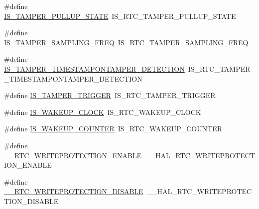 \begin{DoxyCompactItemize}
\item 
\#define \hyperlink{group___h_a_l___r_t_c___aliased___macros_gaf061929111a6987f8a74e09e239d686b}{I\+S\+\_\+\+T\+A\+M\+P\+E\+R\+\_\+\+P\+U\+L\+L\+U\+P\+\_\+\+S\+T\+A\+TE}~I\+S\+\_\+\+R\+T\+C\+\_\+\+T\+A\+M\+P\+E\+R\+\_\+\+P\+U\+L\+L\+U\+P\+\_\+\+S\+T\+A\+TE
\item 
\#define \hyperlink{group___h_a_l___r_t_c___aliased___macros_ga534eeb558f5ddd78594acc82dbc56b9d}{I\+S\+\_\+\+T\+A\+M\+P\+E\+R\+\_\+\+S\+A\+M\+P\+L\+I\+N\+G\+\_\+\+F\+R\+EQ}~I\+S\+\_\+\+R\+T\+C\+\_\+\+T\+A\+M\+P\+E\+R\+\_\+\+S\+A\+M\+P\+L\+I\+N\+G\+\_\+\+F\+R\+EQ
\item 
\#define \hyperlink{group___h_a_l___r_t_c___aliased___macros_ga7da808c5448f1ebf7f29c44dee830446}{I\+S\+\_\+\+T\+A\+M\+P\+E\+R\+\_\+\+T\+I\+M\+E\+S\+T\+A\+M\+P\+O\+N\+T\+A\+M\+P\+E\+R\+\_\+\+D\+E\+T\+E\+C\+T\+I\+ON}~I\+S\+\_\+\+R\+T\+C\+\_\+\+T\+A\+M\+P\+E\+R\+\_\+\+T\+I\+M\+E\+S\+T\+A\+M\+P\+O\+N\+T\+A\+M\+P\+E\+R\+\_\+\+D\+E\+T\+E\+C\+T\+I\+ON
\item 
\#define \hyperlink{group___h_a_l___r_t_c___aliased___macros_gaa0fe0373701cfd583ae46173a60248b2}{I\+S\+\_\+\+T\+A\+M\+P\+E\+R\+\_\+\+T\+R\+I\+G\+G\+ER}~I\+S\+\_\+\+R\+T\+C\+\_\+\+T\+A\+M\+P\+E\+R\+\_\+\+T\+R\+I\+G\+G\+ER
\item 
\#define \hyperlink{group___h_a_l___r_t_c___aliased___macros_ga85becc3221346e2b872ca8f205776a47}{I\+S\+\_\+\+W\+A\+K\+E\+U\+P\+\_\+\+C\+L\+O\+CK}~I\+S\+\_\+\+R\+T\+C\+\_\+\+W\+A\+K\+E\+U\+P\+\_\+\+C\+L\+O\+CK
\item 
\#define \hyperlink{group___h_a_l___r_t_c___aliased___macros_ga806f88006a410ad9a990d4b1dff449f4}{I\+S\+\_\+\+W\+A\+K\+E\+U\+P\+\_\+\+C\+O\+U\+N\+T\+ER}~I\+S\+\_\+\+R\+T\+C\+\_\+\+W\+A\+K\+E\+U\+P\+\_\+\+C\+O\+U\+N\+T\+ER
\item 
\#define \hyperlink{group___h_a_l___r_t_c___aliased___macros_gad93d3e4b8add5593e8a4c0ee4b60c659}{\+\_\+\+\_\+\+R\+T\+C\+\_\+\+W\+R\+I\+T\+E\+P\+R\+O\+T\+E\+C\+T\+I\+O\+N\+\_\+\+E\+N\+A\+B\+LE}~\+\_\+\+\_\+\+H\+A\+L\+\_\+\+R\+T\+C\+\_\+\+W\+R\+I\+T\+E\+P\+R\+O\+T\+E\+C\+T\+I\+O\+N\+\_\+\+E\+N\+A\+B\+LE
\item 
\#define \hyperlink{group___h_a_l___r_t_c___aliased___macros_ga50e1d57530318f33dfa59d44c3f086ce}{\+\_\+\+\_\+\+R\+T\+C\+\_\+\+W\+R\+I\+T\+E\+P\+R\+O\+T\+E\+C\+T\+I\+O\+N\+\_\+\+D\+I\+S\+A\+B\+LE}~\+\_\+\+\_\+\+H\+A\+L\+\_\+\+R\+T\+C\+\_\+\+W\+R\+I\+T\+E\+P\+R\+O\+T\+E\+C\+T\+I\+O\+N\+\_\+\+D\+I\+S\+A\+B\+LE
\end{DoxyCompactItemize}


